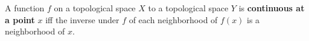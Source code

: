 A function $f$ on a topological space $X$ to a topological space $Y$ is \textbf{continuous at a point} $x$ iff the inverse under $f$ of each neighborhood of $f(x)$ is a neighborhood of $x$.
